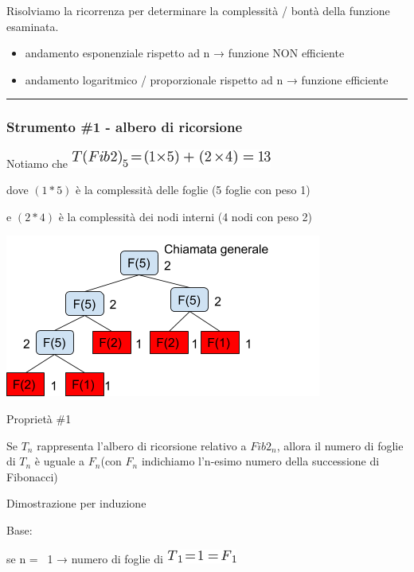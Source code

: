 \documentclass{article}
\providecommand{\tightlist}{%
  \setlength{\itemsep}{0pt}\setlength{\parskip}{0pt}}
\begin{document}
{}

{Risolviamo la ricorrenza per determinare la complessità / bontà della
funzione esaminata.}

\begin{itemize}
\tightlist
\item
  {andamento esponenziale rispetto ad n → funzione NON efficiente}
\item
  {andamento logaritmico / proporzionale rispetto ad n → funzione
  efficiente}
\end{itemize}

\begin{center}\rule{0.5\linewidth}{\linethickness}\end{center}

\hypertarget{h.x4ciu865ga1f}{\subsubsection{\texorpdfstring{{Strumento
\#1 - albero di
ricorsione}}{Strumento \#1 - albero di ricorsione}}\label{h.x4ciu865ga1f}}

{Notiamo che }\includegraphics{images/image33.png}

{dove $(1 * 5)$ è la complessità delle foglie (5 foglie con peso 1)}

{e $(2 * 4)$ è la complessità dei nodi interni (4 nodi con peso 2)}

{\includegraphics{images/image523.png}}

{Proprietà \#1}

{Se $T_n$ rappresenta l'albero di ricorsione relativo a $Fib2_n$, allora il numero di foglie di $T_n$ è uguale a $F_n$(con $F_n$ indichiamo l'n-esimo numero della successione di Fibonacci)}

{Dimostrazione per induzione}

{Base:}

{se n = ~1 → numero di foglie di }\includegraphics{images/image35.png}
\end{document}
